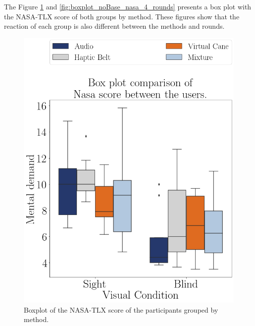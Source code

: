 The Figure \ref{fig:boxplot_noBase_nasa_4_scene} and \ref{fig:boxplot_noBase_nasa_4_rounds} presents a box plot with the NASA-TLX score of both groups by method. These figures show that the reaction of each group is also different between the methods and rounds.

\begin{figure}[!htb]
    \centering
    \begin{minipage}{0.45\textwidth}
        \centering
        \includegraphics[width = 0.8\linewidth]{Resultados/Nasa/Figuras/png/boxplot_noBase_nasa_4_scene.png}
        \caption{Boxplot of the NASA-TLX score of the participants grouped by method.}
        \label{fig:boxplot_noBase_nasa_4_scene}
    \end{minipage}
    \begin{minipage}{0.45\textwidth}
        \centering

\end{minipage}
\end{figure}
